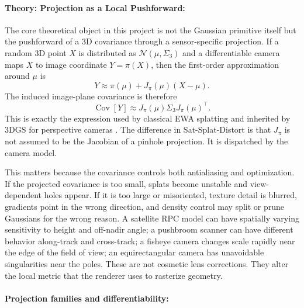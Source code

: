 \documentclass{article}
\begin{document}
\paragraph{Theory: Projection as a Local Pushforward:}

The core theoretical object in this project is not the Gaussian primitive itself but the pushforward of a 3D covariance through a sensor-specific projection. If a random 3D point $X$ is distributed as $\mathcal{N}(\mu,\Sigma_3)$ and a differentiable camera maps $X$ to image coordinate $Y=\pi(X)$, then the first-order approximation around $\mu$ is
\begin{equation}
  Y \approx \pi(\mu) + J_{\pi}(\mu)(X-\mu).
\end{equation}
The induced image-plane covariance is therefore
\begin{equation}
  \operatorname{Cov}[Y] \approx J_{\pi}(\mu)\Sigma_3J_{\pi}(\mu)^{\top}.
\end{equation}
This is exactly the expression used by classical EWA splatting and inherited by 3DGS for perspective cameras \citep{zwicker2002ewa,kerbl20233d}. The difference in Sat-Splat-Distort is that $J_{\pi}$ is not assumed to be the Jacobian of a pinhole projection. It is dispatched by the camera model.

This matters because the covariance controls both antialiasing and optimization. If the projected covariance is too small, splats become unstable and view-dependent holes appear. If it is too large or misoriented, texture detail is blurred, gradients point in the wrong direction, and density control may split or prune Gaussians for the wrong reason. A satellite RPC model can have spatially varying sensitivity to height and off-nadir angle; a pushbroom scanner can have different behavior along-track and cross-track; a fisheye camera changes scale rapidly near the edge of the field of view; an equirectangular camera has unavoidable singularities near the poles. These are not cosmetic lens corrections. They alter the local metric that the renderer uses to rasterize geometry.

\paragraph{Projection families and differentiability:}
\end{document}
